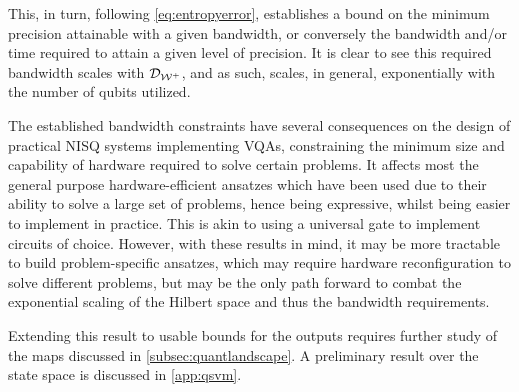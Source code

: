 This, in turn, following \autoref{eq:entropyerror}, establishes a bound on the
minimum precision attainable with a given bandwidth, or conversely the bandwidth
and/or time required to attain a given level of precision. It is clear to see
this required bandwidth scales with \(\mathcal{D}_{\mathcal{W^+}}\), and as such,
scales, in general, exponentially with the number of qubits utilized.

The established bandwidth constraints have several consequences on the design of
practical NISQ systems implementing VQAs, constraining the minimum size and
capability of hardware required to solve certain problems. It affects most the
general purpose hardware-efficient ansatzes which have been used due to their
ability to solve a large set of problems, hence being expressive, whilst being
easier to implement in practice. This is akin to using a universal gate to
implement circuits of choice. However, with these results in mind, it may be
more tractable to build problem-specific ansatzes, which may require hardware
reconfiguration to solve different problems, but may be the only path forward to
combat the exponential scaling of the Hilbert space and thus the bandwidth
requirements.

Extending this result to usable bounds for the outputs requires further study of
the maps discussed in \autoref{subsec:quantlandscape}. A preliminary result over
the state space is discussed in \autoref{app:qsvm}.
